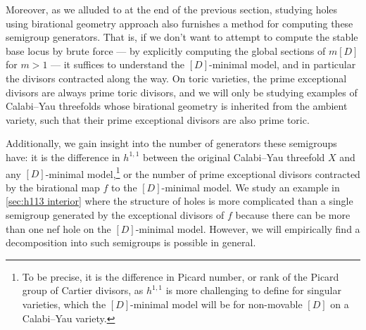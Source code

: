 \documentclass[11pt,dvipsnames]{article}
\theoremstyle{definition}
\begin{document}
Moreover, as we alluded to at the end of the previous section, studying holes using birational geometry approach also furnishes a method for computing these semigroup generators. That is, if we don't want to attempt to compute the stable base locus by brute force --- by explicitly computing the global sections of $m[D]$ for $m > 1$ --- it suffices to understand the $[D]$-minimal model, and in particular the divisors contracted along the way. On toric varieties, the prime exceptional divisors are always prime toric divisors, and we will only be studying examples of Calabi--Yau threefolds whose birational geometry is inherited from the ambient variety, such that their prime exceptional divisors are also prime toric.

Additionally, we gain insight into the number of generators these semigroups have: it is the difference in $h^{1,1}$ between the original Calabi--Yau threefold $X$ and any $[D]$-minimal model,\footnote{To be precise, it is the difference in Picard number, or rank of the Picard group of Cartier divisors, as $h^{1,1}$ is more challenging to define for singular varieties, which the $[D]$-minimal model will be for non-movable $[D]$ on a Calabi--Yau variety.} or the number of prime exceptional divisors contracted by the birational map $f$ to the $[D]$-minimal model. We study an example in \cref{sec:h113 interior} where the structure of holes is more complicated than a single semigroup generated by the exceptional divisors of $f$ because there can be more than one nef hole on the $[D]$-minimal model. However, we will empirically find a decomposition into such semigroups is possible in general.
\end{document}
